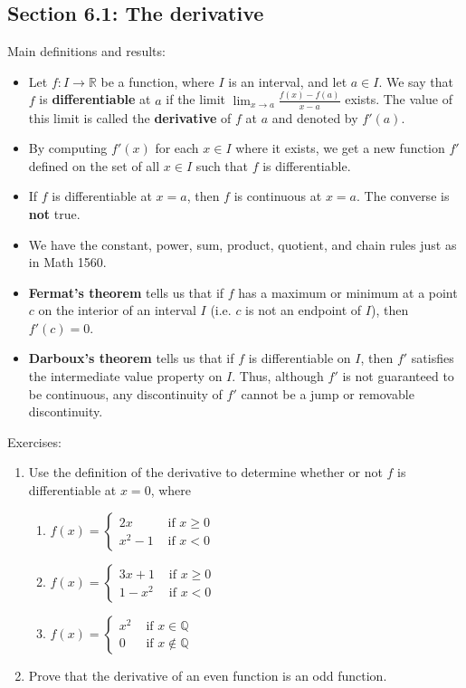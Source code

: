 \documentclass[letterpaper,12pt]{article}
\newcommand{\Q}{\mathbb{Q}}
\newcommand{\R}{\mathbb{R}}
\begin{document}
\subsection*{Section 6.1: The derivative}
Main definitions and results:
\begin{itemize}
 \item Let $f:I\to\R$ be a function, where $I$ is an interval, and let $a\in I$. We say that $f$ is {\bf differentiable} at $a$ if the limit $\displaystyle \lim_{x\to a}\frac{f(x)-f(a)}{x-a}$ exists. The value of this limit is called the {\bf derivative} of $f$ at $a$ and denoted by $f'(a)$.
 \item By computing $f'(x)$ for each $x\in I$ where it exists, we get a new function $f'$ defined on the set of all $x\in I$ such that $f$ is differentiable.
 \item If $f$ is differentiable at $x=a$, then $f$ is continuous at $x=a$. The converse is {\bf not} true.
 \item We have the constant, power, sum, product, quotient, and chain rules just as in Math 1560.
 \item {\bf Fermat's theorem} tells us that if $f$ has a maximum or minimum at a point $c$ on the interior of an interval $I$ (i.e. $c$ is not an endpoint of $I$), then $f'(c)=0$.
 \item {\bf Darboux's theorem} tells us that if $f$ is differentiable on $I$, then $f'$ satisfies the intermediate value property on $I$. Thus, although $f'$ is not guaranteed to be continuous, any discontinuity of $f'$ cannot be a jump or removable discontinuity.
\end{itemize}

\noindent Exercises:
\begin{enumerate}
 \item Use the definition of the derivative to determine whether or not $f$ is differentiable at $x=0$, where
\begin{enumerate}
 \item $f(x) = \begin{cases} 2x & \text{ if } x\geq 0\\ x^2-1 & \text{ if } x<0\end{cases}$
 \item $f(x) = \begin{cases} 3x+1 & \text{ if } x\geq 0 \\ 1-x^2 & \text{ if } x<0\end{cases}$
 \item $f(x) = \begin{cases} x^2 & \text{ if } x\in \Q \\ 0 & \text{ if } x\notin \Q\end{cases}$
\end{enumerate}

 \item Prove that the derivative of an even function is an odd function.
\end{enumerate}
\end{document}

